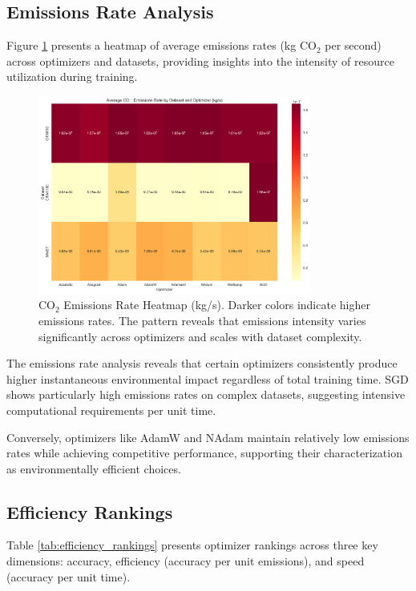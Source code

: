 \documentclass[conference]{IEEEtran}
\begin{document}
\subsection{Emissions Rate Analysis}

Figure \ref{fig:emissions_rate} presents a heatmap of average emissions rates (kg CO$_2$ per second) across optimizers and datasets, providing insights into the intensity of resource utilization during training.

\begin{figure}[htbp]
\centering
\includegraphics[width=0.8\textwidth]{emissions_rate_heatmap.png}
\caption{CO$_2$ Emissions Rate Heatmap (kg/s). Darker colors indicate higher emissions rates. The pattern reveals that emissions intensity varies significantly across optimizers and scales with dataset complexity.}
\label{fig:emissions_rate}
\end{figure}

The emissions rate analysis reveals that certain optimizers consistently produce higher instantaneous environmental impact regardless of total training time. SGD shows particularly high emissions rates on complex datasets, suggesting intensive computational requirements per unit time.

Conversely, optimizers like AdamW and NAdam maintain relatively low emissions rates while achieving competitive performance, supporting their characterization as environmentally efficient choices.


\subsection{Efficiency Rankings}

Table \ref{tab:efficiency_rankings} presents optimizer rankings across three key dimensions: accuracy, efficiency (accuracy per unit emissions), and speed (accuracy per unit time).
\end{document}
